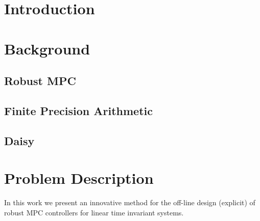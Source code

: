 \documentclass[sigconf]{acmart}
\begin{document}

%

%


\section{Introduction}
\section{Background}
\subsection{Robust MPC}
\subsection{Finite Precision Arithmetic}
\subsection{Daisy}
\section{Problem Description}
In this work we present an innovative method for the off-line design (explicit) of robust MPC controllers for linear time invariant systems.
\end{document}
